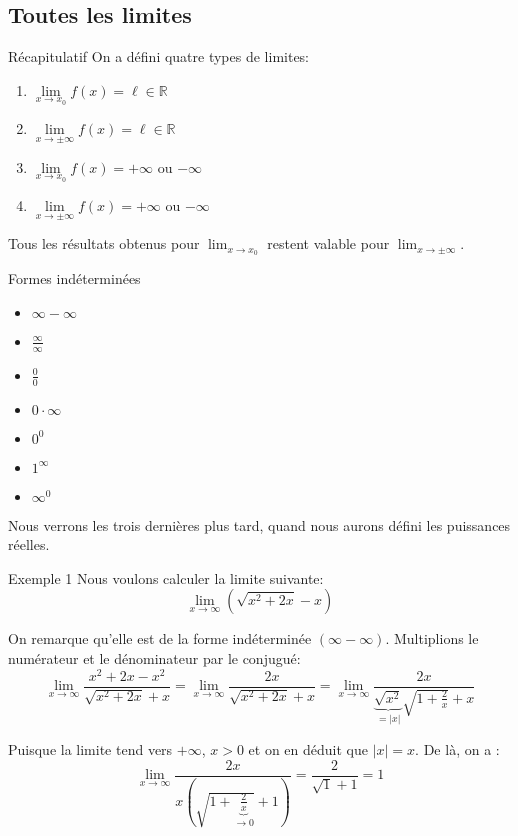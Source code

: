 \documentclass[a4paper]{article}
\begin{document}
\subsection{Toutes les limites}
\begin{parag}{Récapitulatif}
    On a défini quatre types de limites:
    \begin{enumerate}
        \item $\lim\limits_{x \to x_0} f\left(x\right) = \ell \in \mathbb{R}$
        \item $\lim\limits_{x \to \pm\infty} f\left(x\right) = \ell \in \mathbb{R}$
        \item $\lim\limits_{x \to x_0} f\left(x\right) = +\infty$ ou $-\infty$
        \item $\lim\limits_{x \to \pm\infty} f\left(x\right) = +\infty$ ou $-\infty$
    \end{enumerate}

    Tous les résultats obtenus pour $\lim_{x \to x_0} $ restent valable pour $\lim_{x \to \pm\infty} $.
\end{parag}

\begin{parag}{Formes indéterminées}
    \begin{itemize}[left=0pt]
        \item $\infty - \infty$
        \item $\frac{\infty}{\infty}$
        \item $\frac{0}{0}$
        \item $0\cdot \infty$
        \item $0^0$
        \item $1^{\infty}$
        \item $\infty^0$
    \end{itemize}

    Nous verrons les trois dernières plus tard, quand nous aurons défini les puissances réelles.
\end{parag}

\begin{parag}{Exemple 1}
    Nous voulons calculer la limite suivante:
    \[\lim_{x \to \infty} \left(\sqrt{x^2 + 2x} - x\right)\]

    On remarque qu'elle est de la forme indéterminée $\left(\infty - \infty\right)$. Multiplions le numérateur et le dénominateur par le conjugué:
    \[\lim_{x \to \infty} \frac{x^2 + 2x - x^2}{\sqrt{x^2 + 2x} + x} = \lim_{x \to \infty} \frac{2x}{\sqrt{x^2 + 2x} + x} = \lim_{x \to \infty} \frac{2x}{\underbrace{\sqrt{x^2}}_{= \left|x\right|}\sqrt{1 + \frac{2}{x}} + x}\]

    Puisque la limite tend vers $+\infty$, $x > 0$ et on en déduit que $\left|x\right| = x$. De là, on a :
    \[\lim_{x \to \infty} \frac{2x}{x\left(\sqrt{1 + \underbrace{\frac{2}{x}}_{\to 0}} + 1\right)} = \frac{2}{\sqrt{1} + 1} = 1\]
\end{parag}
\end{document}
